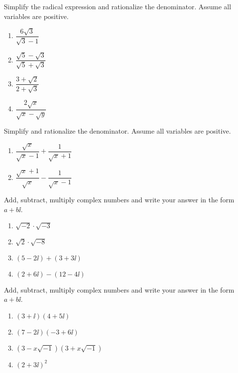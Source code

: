 \begin{exercise}
  Simplify the radical expression and rationalize the denominator. Assume
  all variables are positive.
  
  \begin{enumerate}
  \item
    \(\dfrac{6\sqrt3}{\sqrt3-1}\)
  \item
    \(\dfrac{\sqrt5-\sqrt3}{\sqrt5+\sqrt3}\)
  \item
    \(\dfrac{3+\sqrt2}{2+\sqrt3}\)
  \item
    \(\dfrac{2\sqrt{x}}{\sqrt x- \sqrt y}\)
  \end{enumerate}
\end{exercise}

\begin{exercise}
  Simplify and rationalize the denominator. Assume all variables are
  positive.
  
  \begin{enumerate}
  \item
    \(\dfrac{\sqrt{x}}{\sqrt x-1}+\dfrac{1}{\sqrt{x}+1}\)
  \item
    \(\dfrac{\sqrt{x}+1}{\sqrt x}-\dfrac{1}{\sqrt{x}-1}\)
  \end{enumerate}
\end{exercise}

\begin{exercise}
  Add, subtract, multiply complex numbers and write your answer in the
  form \(a+b\ii\).
  
  \begin{enumerate}
  \item
    \(\sqrt{-2}\cdot\sqrt{-3}\)
  \item
    \(\sqrt{2}\cdot\sqrt{-8}\)
  \item
    \((5-2\ii)+(3+3\ii)\)
  \item
    \((2+6\ii)-(12-4\ii)\)
  \end{enumerate}
\end{exercise}

\begin{exercise}
  Add, subtract, multiply complex numbers and write your answer in the
  form \(a+b\ii\).
  
  \begin{enumerate}
  \item
    \((3+\ii)(4+5\ii)\)
  \item
    \((7-2\ii)(-3+6\ii)\)
  \item
    \((3-x\sqrt{-1})(3+x\sqrt{-1})\)
  \item
    \((2+3\ii)^2\)
  \end{enumerate}
\end{exercise}


